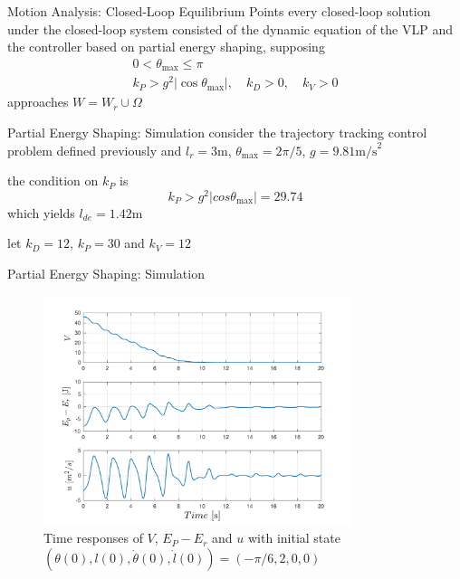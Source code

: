 \documentclass[10pt]{beamer}
\begin{document}
  \begin{frame}{Motion Analysis: Closed-Loop Equilibrium Points}
    every closed-loop solution under the closed-loop
    system consisted of the dynamic equation of the VLP and the controller
    based on partial energy shaping, supposing
    \begin{gather*}
    0<\theta_{\max}\le\pi \\
    k_P>g^2|\cos\theta_{\max}|, \quad k_D>0, \quad k_V>0
    \end{gather*}
    approaches $W=W_r\cup\Omega$
  \end{frame}

  \begin{frame}{Partial Energy Shaping: Simulation}
    consider the trajectory tracking control problem defined previously
    and $l_r=3\text{m}$, $\theta_{\max}=2\pi/5$, $g=9.81\text{m/s}^2$
    
    the condition on $k_P$ is 
    \begin{equation*}
      k_P > g^2 |cos\theta_{\max}| = 29.74
    \end{equation*}
    which yields $l_{de}=1.42$m

    \vspace{1cm}
    
    let $k_D=12$, $k_P=30$ and $k_V=12$
  \end{frame}

  \begin{frame}{Partial Energy Shaping: Simulation}
    \begin{figure}
      \caption*{Time responses of $V$, $E_P-E_r$ and $u$ with initial state 
        $(\theta(0), l(0), \dot{\theta}(0), \dot{l}(0))=(-\pi/6, 2, 0, 0)$}
      \vspace{-0.3cm}
      \includegraphics[width=0.8\textwidth]{images/partial_1.pdf}
    \end{figure}
  \end{frame}
\end{document}
